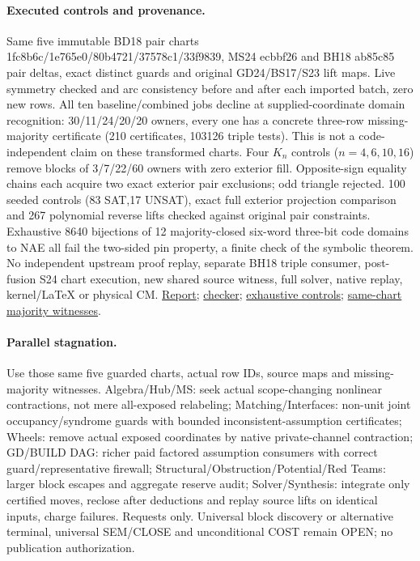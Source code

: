 \documentclass[11pt]{article}
\begin{document}
\paragraph{Executed controls and provenance.}
Same five immutable BD18 pair charts 1fc8b6c/1e765e0/80b4721/37578c1/33f9839, MS24 ecbbf26 and BH18 ab85c85 pair deltas, exact distinct guards and original GD24/BS17/S23 lift maps. Live symmetry checked and arc consistency before and after each imported batch, zero new rows. All ten baseline/combined jobs decline at supplied-coordinate domain recognition: 30/11/24/20/20 owners, every one has a concrete three-row missing-majority certificate (210 certificates, 103126 triple tests). This is not a code-independent claim on these transformed charts. Four $K_n$ controls ($n=4,6,10,16$) remove blocks of 3/7/22/60 owners with zero exterior fill. Opposite-sign equality chains each acquire two exact exterior pair exclusions; odd triangle rejected. 100 seeded controls (83 SAT,17 UNSAT), exact full exterior projection comparison and 267 polynomial reverse lifts checked against original pair constraints. Exhaustive 8640 bijections of 12 majority-closed six-word three-bit code domains to NAE all fail the two-sided pin property, a finite check of the symbolic theorem. No independent upstream proof replay, separate BH18 triple consumer, post-fusion S24 chart execution, new shared source witness, full solver, native replay, kernel/LaTeX or physical CM. \href{https://github.com/j15marti/pnp/commit/642e7c1ffe688ac571b8b263477bec76dcbe8ae9}{Report}; \href{https://github.com/j15marti/pnp/commit/3d13bb34ce5f53bf3934bcf841bb12a5af19a6d2}{checker}; \href{https://github.com/j15marti/pnp/commit/086e00bf42e8704efb6176896fb88e89c0a9cecd}{exhaustive controls}; \href{https://github.com/j15marti/pnp/commit/05052d1a453bedd8e1ee54783254bb3cde6909cf}{same-chart majority witnesses}.
\paragraph{Parallel stagnation.}
Use those same five guarded charts, actual row IDs, source maps and missing-majority witnesses. Algebra/Hub/MS: seek actual scope-changing nonlinear contractions, not mere all-exposed relabeling; Matching/Interfaces: non-unit joint occupancy/syndrome guards with bounded inconsistent-assumption certificates; Wheels: remove actual exposed coordinates by native private-channel contraction; GD/BUILD DAG: richer paid factored assumption consumers with correct guard/representative firewall; Structural/Obstruction/Potential/Red Teams: larger block escapes and aggregate reserve audit; Solver/Synthesis: integrate only certified moves, reclose after deductions and replay source lifts on identical inputs, charge failures. Requests only. Universal block discovery or alternative terminal, universal SEM/CLOSE and unconditional COST remain OPEN; no publication authorization.
\end{document}
